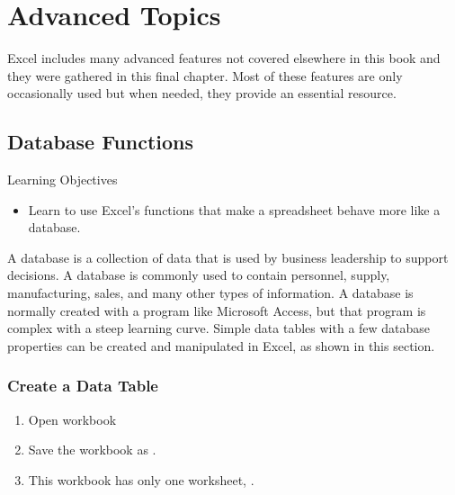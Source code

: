 \chapter{Advanced Topics}\label{ch09:topics}

Excel includes many advanced features not covered elsewhere in this book and they were gathered in this final chapter. Most of these features are only occasionally used but when needed, they provide an essential resource.

\section{Database Functions}

\begin{center}
	\begin{objbox}{Learning Objectives}
		\begin{itemize}
			\setlength{\itemsep}{0pt}
			\setlength{\parskip}{0pt}
			\setlength{\parsep}{0pt}
			
			\item Learn to use Excel's functions that make a spreadsheet behave more like a database.
		\end{itemize}
	\end{objbox}
\end{center}

A database is a collection of data that is used by business leadership to support decisions. A database is commonly used to contain personnel, supply, manufacturing, sales, and many other types of information. A database is normally created with a program like Microsoft Access, but that program is complex with a steep learning curve. Simple data tables with a few database properties can be created and manipulated in Excel, as shown in this section.

\subsection{Create a Data Table}

\begin{enumbox}
	\begin{enumerate}
		\item Open workbook 
		\item Save the workbook as .
		\item This workbook has only one worksheet, .
	\end{enumerate}
\end{enumbox}
	
